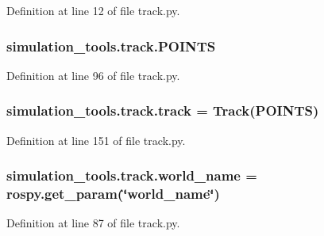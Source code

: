 Definition at line 12 of file track.\+py.

\subsubsection[{\texorpdfstring{P\+O\+I\+N\+TS}{POINTS}}]{\setlength{\rightskip}{0pt plus 5cm}simulation\+\_\+tools.\+track.\+P\+O\+I\+N\+TS}\hypertarget{namespacesimulation__tools_1_1track_ab9ddc4d3ba8bb81a3ce02320f46c8a55}{}\label{namespacesimulation__tools_1_1track_ab9ddc4d3ba8bb81a3ce02320f46c8a55}


Definition at line 96 of file track.\+py.

\subsubsection[{\texorpdfstring{track}{track}}]{\setlength{\rightskip}{0pt plus 5cm}simulation\+\_\+tools.\+track.\+track = {\bf Track}({\bf P\+O\+I\+N\+TS})}\hypertarget{namespacesimulation__tools_1_1track_ac731095c2502c445d46302406cb81651}{}\label{namespacesimulation__tools_1_1track_ac731095c2502c445d46302406cb81651}


Definition at line 151 of file track.\+py.

\subsubsection[{\texorpdfstring{world\+\_\+name}{world_name}}]{\setlength{\rightskip}{0pt plus 5cm}simulation\+\_\+tools.\+track.\+world\+\_\+name = rospy.\+get\+\_\+param(\char`\"{}world\+\_\+name\char`\"{})}\hypertarget{namespacesimulation__tools_1_1track_ab4fe6910a622507d50763ab0aeb7d990}{}\label{namespacesimulation__tools_1_1track_ab4fe6910a622507d50763ab0aeb7d990}


Definition at line 87 of file track.\+py.

